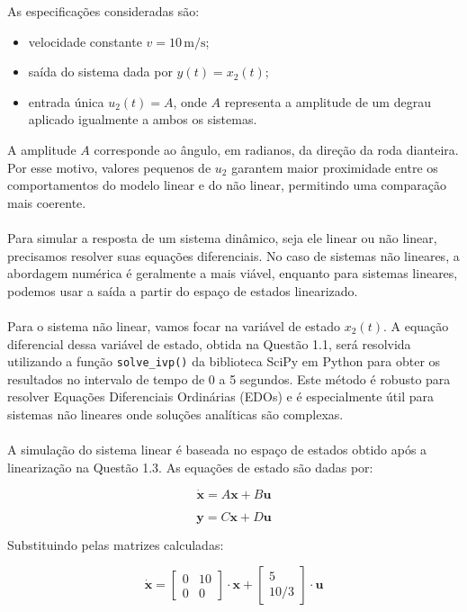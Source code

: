 \documentclass[a4paper,11pt]{article}
\begin{document}
As especificações consideradas são:
\begin{itemize}
    \item velocidade constante \( v = 10 \, \text{m/s} \);
    \item saída do sistema dada por \( y(t) = x_2(t) \);
    \item entrada única \( u_2(t) = A \), onde \( A \) representa a amplitude de um degrau aplicado igualmente a ambos os sistemas.
\end{itemize}

A amplitude \( A \) corresponde ao ângulo, em radianos, da direção da roda dianteira. Por esse motivo, valores pequenos de \( u_2 \) garantem maior proximidade entre os comportamentos do modelo linear e do não linear, permitindo uma comparação mais coerente.
\\\\
Para simular a resposta de um sistema dinâmico, seja ele linear ou não linear, precisamos resolver suas equações diferenciais. No caso de sistemas não lineares, a abordagem numérica é geralmente a mais viável, enquanto para sistemas lineares, podemos usar a saída a partir do espaço de estados linearizado.
\\\\
Para o sistema não linear, vamos focar na variável de estado $x_2(t)$. A equação diferencial dessa variável de estado, obtida na Questão 1.1, será resolvida utilizando a função \texttt{solve\_ivp()} da biblioteca SciPy em Python para obter os resultados no intervalo de tempo de 0 a 5 segundos. Este método é robusto para resolver Equações Diferenciais Ordinárias (EDOs) e é especialmente útil para sistemas não lineares onde soluções analíticas são complexas.
\\\\
A simulação do sistema linear é baseada no espaço de estados obtido após a linearização na Questão 1.3. As equações de estado são dadas por:

$$
\dot{\textbf{x}} = A\textbf{x}+B\textbf{u}
$$

$$
\textbf{y} = C\textbf{x} + D\textbf{u}
$$

Substituindo pelas matrizes calculadas:

$$
\dot{\textbf{x}} = \begin{bmatrix} 0 & 10 \\ 0 & 0 \end{bmatrix} \cdot \textbf{x} + \begin{bmatrix} 5 \\ 10/3 \end{bmatrix} \cdot \textbf{u}
$$
\end{document}
